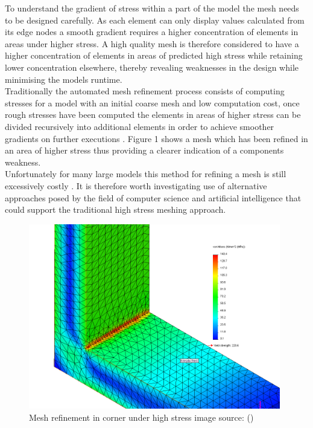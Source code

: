 \noindent
To understand the gradient of stress within a part of the model the mesh needs to be designed carefully. As each element can only display values calculated from its edge nodes a smooth gradient requires a higher concentration of elements in areas under higher stress. A high quality mesh is therefore considered to have a higher concentration of elements in areas of predicted high stress while retaining lower concentration elsewhere, thereby revealing weaknesses in the design while minimising the models runtime.\\

\noindent
Traditionally the automated mesh refinement process consists of computing stresses for a model with an initial coarse mesh and low computation cost, once rough stresses have been computed the elements in areas of higher stress can be divided recursively into additional elements in order to achieve smoother gradients on further executions \cite{cite03}. Figure 1 shows a mesh which has been refined in an area of higher stress thus providing a clearer indication of a components weakness. \\ 

\noindent
Unfortunately for many large models this method for refining a mesh is still excessively costly \cite{DolsakPaper91}. It is therefore worth investigating use of alternative approaches posed by the field of computer science and artificial intelligence that could support the traditional high stress meshing approach. 

\begin{figure}[h!!]
  \centerline{\includegraphics[width=110mm, scale=0.5]{../Graphics/stressedCorner.png}}
  \caption{Mesh refinement in corner under high stress image source: (\cite{HighStressCorner})}
  \label{fig:boat1}
\end{figure}